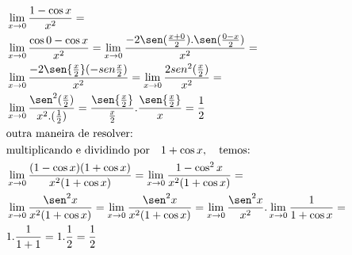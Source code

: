 \begin{ex}
\begin{align}
&\lim_{x\rightarrow 0} \frac{1-\cos{x}}{x^2}=\nonumber\\
&\lim_{x\rightarrow 0} \frac{\cos{0}-\cos{x}}{x^2}=\lim_{x\rightarrow 0} \frac{-2\sen({\frac{x+0}{2}}).\sen({\frac{0-x}{2}})}{x^2}=\nonumber\\
&\lim_{x\rightarrow 0} \frac{-2\sen{\frac{x}{2}}(-sen{\frac{x}{2}})}{x^2}=\lim_{x\rightarrow 0}\frac{2sen^2({\frac{x}{2}})}{x^2}=\nonumber\\
&\lim_{x\rightarrow 0} \frac{\sen^2({\frac{x}{2}})}{x^2.(\frac{1}{2})}=\frac{\sen{\frac{x}{2}}}{\frac{x}{2}}.\frac{\sen{\frac{x}{2}}}{x}=\frac{1}{2}\nonumber\\
&\text{outra maneira de resolver:}\nonumber\\
&\text{multiplicando e dividindo por}\quad 1+\cos{x},\quad\text{temos:}\nonumber\\
&\lim_{x\rightarrow 0} \frac{(1-\cos{x})(1+\cos{x})}{x^2(1+\cos{x})}=\lim_{x\rightarrow 0} \frac{1-\cos^2{x}}{x^2(1+\cos{x})}=\nonumber\\
&\lim_{x\rightarrow 0} \frac{\sen^2{x}}{x^2(1+\cos{x})}=\lim_{x\rightarrow 0} \frac{\sen^2{x}}{x^2(1+\cos{x})}=\lim_{x\rightarrow 0} \frac{\sen^2{x}}{x^2}.\lim_{x\rightarrow 0} \frac{1}{1+\cos{x}}=\nonumber\\
&1.\frac{1}{1+1}=1.\frac{1}{2}=\frac{1}{2}\nonumber
\end{align}
\end{ex}